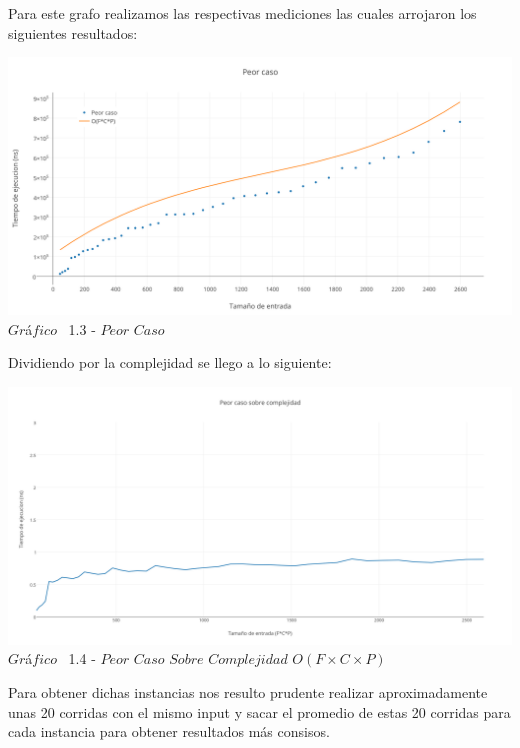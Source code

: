 Para este grafo realizamos las respectivas mediciones las cuales arrojaron los siguientes resultados:\\


\vspace*{0.3cm} \vspace*{0.3cm}
  \begin{center}
\includegraphics[scale=0.4]{./EJ1/peorcaso.png}
{$Gr$\'a$fico$ \ 1.3 - $Peor$ $Caso$}
  \end{center}
  \vspace*{0.3cm}

Dividiendo por la complejidad se llego a lo siguiente:\\

\vspace*{0.3cm} \vspace*{0.3cm}
  \begin{center}
\includegraphics[scale=0.5]{./EJ1/peorcaso1.png}
{$Gr$\'a$fico$ \ 1.4 - $Peor$ $Caso$ $Sobre$ $Complejidad$ $O(F \times C \times P)$}
  \end{center}
  \vspace*{0.3cm}

 Para obtener dichas instancias nos resulto prudente realizar aproximadamente unas 20 corridas con el mismo input y sacar el promedio de estas 20 corridas para cada instancia para obtener resultados m\'as consisos.\\ 

